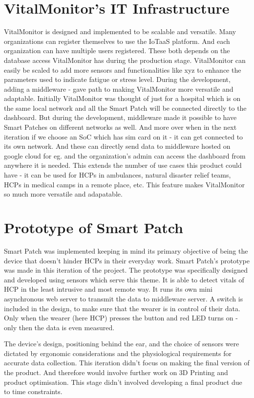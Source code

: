 \section{VitalMonitor's IT Infrastructure}

VitalMonitor is designed and implemented to be scalable and versatile.  Many organizations can register themselves to use the IoTaaS platform. And each organization can have multiple users registered. These both depends on the database access VitalMonitor has during the production stage. VitalMonitor can easily be scaled to add more sensors and functionalities like xyz to enhance the parameters used to indicate fatigue or stress level. During the development, adding a middleware - gave path to making VitalMonitor more versatile and adaptable. Initially VitalMonitor was thought of just for a hospital which is on the same local network and all the Smart Patch will be connected directly to the dashboard. But during the development, middleware made it possible to have Smart Patches on different networks as well. And more over when in the next iteration if we choose an SoC which has sim card on it - it can get connected to its own network. And these can directly send data to middleware hosted on google cloud for eg. and the organization's admin can access the dashboard from anywhere it is needed. This extends the number of use cases this product could have - it can be used for HCPs in ambulances, natural disaster relief teams, HCPs in medical camps in a remote place, etc. This feature makes VitalMonitor so much more versatile and adapatable.  



\section{Prototype of Smart Patch}
Smart Patch was implemented keeping in mind its primary objective of being the device that doesn't hinder HCPs in their everyday work. Smart Patch's prototype was made in this iteration of the project. The prototype was specifically designed and developed using sensors which serve this theme. It is able to detect vitals of HCP in the least intrusive and most remote way. It runs its own mini asynchronous web server to transmit the data to middleware server. A switch is included in the design, to make sure that the wearer is in control of their data. Only when the wearer (here HCP) presses the button and red LED turns on - only then the data is even measured. 

The device's design, positioning behind the ear, and the choice of sensors were dictated by ergonomic considerations and the physiological requirements for accurate data collection. This iteration didn't focus on making the final version of the product. And therefore would involve further work on 3D Printing and product optimisation. This stage didn't involved developing a final product due to time constraints.


